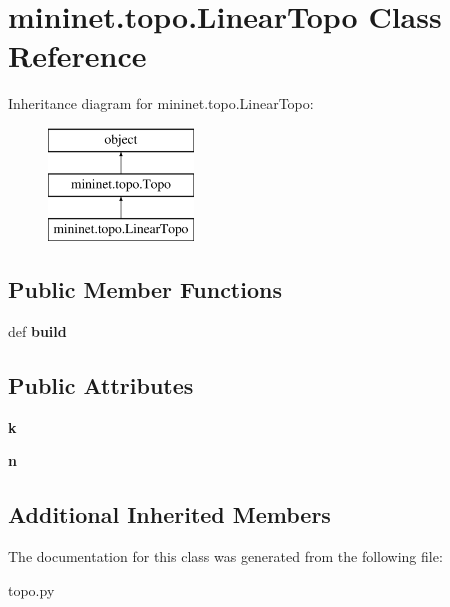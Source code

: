 \hypertarget{classmininet_1_1topo_1_1LinearTopo}{\section{mininet.\-topo.\-Linear\-Topo Class Reference}
\label{classmininet_1_1topo_1_1LinearTopo}
}
Inheritance diagram for mininet.\-topo.\-Linear\-Topo\-:\begin{figure}[H]
\begin{center}
\leavevmode
\includegraphics[height=3.000000cm]{classmininet_1_1topo_1_1LinearTopo}
\end{center}
\end{figure}
\subsection*{Public Member Functions}
\begin{DoxyCompactItemize}
\item 
\hypertarget{classmininet_1_1topo_1_1LinearTopo_a152f44c10be70db7bacfc8c48129aff2}{def {\bfseries build}}\label{classmininet_1_1topo_1_1LinearTopo_a152f44c10be70db7bacfc8c48129aff2}

\end{DoxyCompactItemize}
\subsection*{Public Attributes}
\begin{DoxyCompactItemize}
\item 
\hypertarget{classmininet_1_1topo_1_1LinearTopo_abbcd71eec3dfbb630805413552392052}{{\bfseries k}}\label{classmininet_1_1topo_1_1LinearTopo_abbcd71eec3dfbb630805413552392052}

\item 
\hypertarget{classmininet_1_1topo_1_1LinearTopo_ab8389aae5f0a17d3406be12724316ce9}{{\bfseries n}}\label{classmininet_1_1topo_1_1LinearTopo_ab8389aae5f0a17d3406be12724316ce9}

\end{DoxyCompactItemize}
\subsection*{Additional Inherited Members}


The documentation for this class was generated from the following file\-:\begin{DoxyCompactItemize}
\item 
topo.\-py\end{DoxyCompactItemize}
